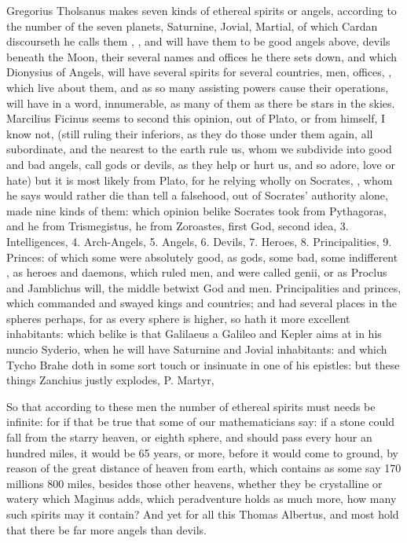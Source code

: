 Gregorius Tholsanus makes seven kinds of ethereal spirits
or angels, according to the number of the seven planets, Saturnine, Jovial,
Martial, of which Cardan discourseth 
he calls them , \etc{}, and will have them to be good angels above, devils
beneath the Moon, their several names and offices he there sets down, and which
Dionysius of Angels, will have several spirits for several countries, men,
offices, \etc{}, which live about them, and as so many assisting powers cause
their operations, will have in a word, innumerable, as many of them as there be
stars in the skies. Marcilius Ficinus seems to second this
opinion, out of Plato, or from himself, I know not, (still ruling their
inferiors, as they do those under them again, all subordinate, and the nearest
to the earth rule us, whom we subdivide into good and bad angels, call gods or
devils, as they help or hurt us, and so adore, love or hate) but it is most
likely from Plato, for he relying wholly on Socrates, , whom he says would rather die than tell a falsehood,
out of Socrates' authority alone, made nine kinds of them: which opinion belike
Socrates took from Pythagoras, and he from Trismegistus, he from Zoroastes,
first God, second idea, 3. Intelligences, 4. Arch-Angels, 5. Angels, 6. Devils,
7. Heroes, 8. Principalities, 9. Princes: of which some were absolutely good,
as gods, some bad, some indifferent , as heroes and
daemons, which ruled men, and were called genii, or as
Proclus and Jamblichus will, the middle betwixt God and
men. Principalities and princes, which commanded and swayed kings and
countries; and had several places in the spheres perhaps, for as every sphere
is higher, so hath it more excellent inhabitants: which belike is that
Galilaeus a Galileo and Kepler aims at in his nuncio Syderio, when he will have
Saturnine and Jovial inhabitants: and which Tycho Brahe
doth in some sort touch or insinuate in one of his epistles: but these things
Zanchius justly explodes,  P. Martyr, 

So that according to these men the number of ethereal spirits must needs be
infinite: for if that be true that some of our mathematicians say: if a stone
could fall from the starry heaven, or eighth sphere, and should pass every hour
an hundred miles, it would be 65 years, or more, before it would come to
ground, by reason of the great distance of heaven from earth, which contains as
some say 170 millions 800 miles, besides those other heavens, whether they be
crystalline or watery which Maginus adds, which peradventure holds as much
more, how many such spirits may it contain? And yet for all this
Thomas Albertus, and most hold that there be far more
angels than devils.


